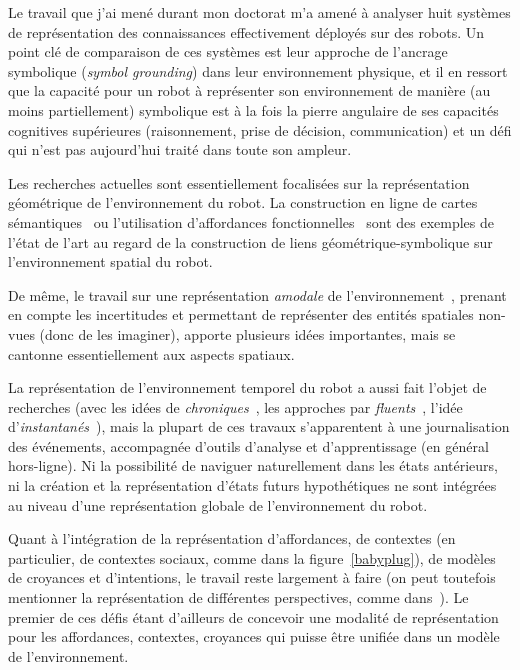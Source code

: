 \documentclass[a4paper]{article}
\begin{document}
Le travail que j'ai mené durant mon doctorat m'a amené à analyser huit systèmes
de représentation des connaissances effectivement déployés sur des robots. Un
point clé de comparaison de ces systèmes est leur approche de l'ancrage
symbolique (\emph{symbol grounding}) dans leur environnement physique, et il en
ressort que la capacité pour un robot à représenter son environnement de manière
(au moins partiellement) symbolique est à la
fois la pierre angulaire de ses capacités cognitives supérieures (raisonnement,
prise de décision, communication) et un défi qui n'est pas aujourd'hui traité
dans toute son ampleur.

Les recherches actuelles sont essentiellement focalisées sur la représentation
géométrique de l'environnement du robot. La construction en ligne de
cartes sémantiques~\cite{Nuechter2008, Galindo2008,
Blodow2011} ou l'utilisation d'affordances fonctionnelles~\cite{Varadarajan2011}
sont des exemples de l'état de l'art au regard de la construction de liens
géométrique-symbolique sur l'environnement spatial du robot.

De même, le travail sur une représentation \emph{amodale} de
l'environnement~\cite{Mavridis2006}, prenant en compte les incertitudes et
permettant de représenter des entités spatiales non-vues (donc de les imaginer),
apporte plusieurs idées importantes, mais se cantonne essentiellement aux
aspects spatiaux.

La représentation de l'environnement temporel du robot a aussi fait l'objet de
recherches (avec les idées de \emph{chroniques}~\cite{Ghallab1996}, les
approches par \emph{fluents}~\cite{mosenlechner2010becoming}, l'idée
d'\emph{instantanés}~\cite{Mavridis2006}), mais la plupart de ces travaux
s'apparentent à une journalisation des événements, accompagnée d'outils
d'analyse et d'apprentissage (en général hors-ligne). Ni la possibilité de
naviguer naturellement dans les états antérieurs, ni la création et la
représentation d'états futurs hypothétiques ne sont intégrées au niveau d'une
représentation globale de l'environnement du robot.

Quant à l'intégration de la représentation d'affordances, de contextes (en
particulier, de contextes sociaux, comme dans la figure~\ref{babyplug}), de
modèles de croyances et d'intentions, le travail reste largement à faire (on
peut toutefois mentionner la représentation de différentes perspectives, comme
dans~\cite{ros2010which}). Le premier de ces défis étant d'ailleurs de concevoir
une modalité de représentation pour les affordances, contextes, croyances qui
puisse être unifiée dans un modèle de l'environnement.
\end{document}
